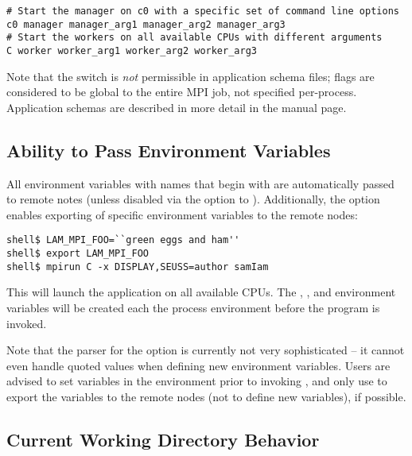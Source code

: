 \lstset{style=lam-cmdline}
\begin{lstlisting}
# Start the manager on c0 with a specific set of command line options
c0 manager manager_arg1 manager_arg2 manager_arg3
# Start the workers on all available CPUs with different arguments
C worker worker_arg1 worker_arg2 worker_arg3
\end{lstlisting}

Note that the  switch is {\em not} permissible in
application schema files;  flags are considered to be
global to the entire MPI job, not specified per-process.  Application
schemas are described in more detail in the  manual
page.


\subsection{Ability to Pass Environment Variables}

All environment variables with names that begin with
 are automatically passed to remote notes (unless
disabled via the  option to ).  Additionally,
the  option enables exporting of specific environment
variables to the remote nodes:

\lstset{style=lam-cmdline}
\begin{lstlisting}
shell$ LAM_MPI_FOO=``green eggs and ham''
shell$ export LAM_MPI_FOO
shell$ mpirun C -x DISPLAY,SEUSS=author samIam
\end{lstlisting}

This will launch the  application on all available CPUs.
The , , and 
environment variables will be created each the process environment
before the  program is invoked.

Note that the parser for the  option is currently not very
sophisticated -- it cannot even handle quoted values when defining new
environment variables.  Users are advised to set variables in the
environment prior to invoking , and only use  to
export the variables to the remote nodes (not to define new
variables), if possible.


\subsection{Current Working Directory Behavior}

